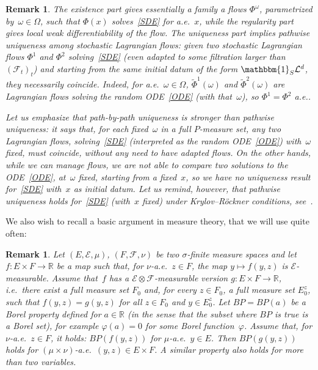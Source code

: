 \documentclass[a4paper,10pt]{article}
\newtheorem{remark}[theorem]{Remark}
\newcommand\1{\mathbbm{1}}
\newcommand{\mc}{\mathcal}
\newcommand{\td}{\tilde}
\numberwithin{equation}{section}
\begin{document}
\begin{remark}
The existence part gives essentially a family a flows $\Phi^\omega$, parametrized by~$\omega \in \Omega$, such that $\Phi(x)$ solves~\eqref{SDE} for a.e.~$x$, while the regularity part gives local weak differentiability of the flow. The uniqueness part implies pathwise uniqueness among stochastic Lagrangian flows: given two stochastic Lagrangian flows $\Phi^1$ and $\Phi^2$ solving~\eqref{SDE} \textup{(}even adapted to some filtration larger than $(\mc{F}_t)_t$\textup{)} and starting from the same initial datum of the form $ \1_{S} \mc{L}^d$, they necessarily coincide. Indeed, for a.e.~$\omega \in \Omega$, $\td{\Phi}^1(\omega)$ and $\td{\Phi}^2(\omega)$ are Lagrangian flows solving the random ODE~\eqref{ODE} \textup{(}with that~$\omega$\textup{)}, so $\Phi^1=\Phi^2$ a.e.. 

Let us emphasize that path-by-path uniqueness is stronger than pathwise uniqueness: it says that, for each fixed~$\omega$ 
in a full $P$-measure set, any two Lagrangian flows, solving~\eqref{SDE} \textup{(}interpreted as the random ODE~\eqref{ODE}\textup{)} with~$\omega$ fixed, must coincide, without any need to have adapted flows. On the other hands, while we can manage flows, we are not able to compare two solutions to the ODE~\eqref{ODE}, at~$\omega$ fixed, starting from a fixed~$x$, so we have no uniqueness result for~\eqref{SDE} with~$x$ as initial datum. Let us remind, however, that pathwise uniqueness holds for~\eqref{SDE} \textup{(}with~$x$ fixed\textup{)} under Krylov--R\"ockner conditions, see~\textup{\cite{KRYROE05}}.
\end{remark}

We also wish to recall a basic argument in measure theory, that we will use quite often:

\begin{remark}\label{simple_rmk}
Let $(E,\mathcal{E},\mu)$, $(F,\mathcal{F},\nu)$ be two $\sigma$-finite measure spaces and let $f \colon E\times F\rightarrow \mathbb{R}$ be a map such that, for $\nu$-a.e.~$z \in F$, the map $y \mapsto f(y,z)$ is $\mathcal{E}$-measurable. Assume that~$f$ has a $\mathcal{E} \otimes \mathcal{F}$-measurable version $g \colon E\times F\rightarrow \mathbb{R}$, i.e.~there exist a full measure set $F_0$ and, for every $z \in F_0$, a full measure set $E_0^z$, such that $f(y,z)=g(y,z)$ for all $z \in F_0$ and $y \in E_0^z$. Let $BP=BP(a)$ be a Borel property defined for $a\in\mathbb{R}$ \textup{(}in the sense that the subset where $BP$ is true is a Borel set\textup{)}, for example $\varphi(a)=0$ for some Borel function~$\varphi$. Assume that, for $\nu$-a.e.~$z \in F$, it holds: $BP(f(y,z))$ for $\mu$-a.e.~$y \in E$. Then $BP(g(y,z))$ holds for $(\mu \times \nu)$-a.e.~$(y,z) \in E \times F$. A similar property also holds for more than two variables.
\end{remark}
\end{document}
